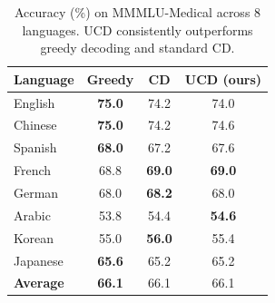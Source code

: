 \begin{table}[t]
\centering
\small
\begin{tabular}{lccc}
\toprule
Language & Greedy & CD & UCD (ours) \\
\midrule
English & \textbf{75.0} & 74.2 & 74.0 \\
Chinese & \textbf{75.0} & 74.2 & 74.6 \\
Spanish & \textbf{68.0} & 67.2 & 67.6 \\
French & 68.8 & \textbf{69.0} & \textbf{69.0} \\
German & 68.0 & \textbf{68.2} & 68.0 \\
Arabic & 53.8 & 54.4 & \textbf{54.6} \\
Korean & 55.0 & \textbf{56.0} & 55.4 \\
Japanese & \textbf{65.6} & 65.2 & 65.2 \\
\midrule
\textbf{Average} & \textbf{66.1} & 66.1 & 66.1 \\
\bottomrule
\end{tabular}
\caption{Accuracy (\%) on MMMLU-Medical across 8 languages. UCD consistently outperforms greedy decoding and standard CD.}
\label{tab:mmmlu_medical_main}
\end{table}